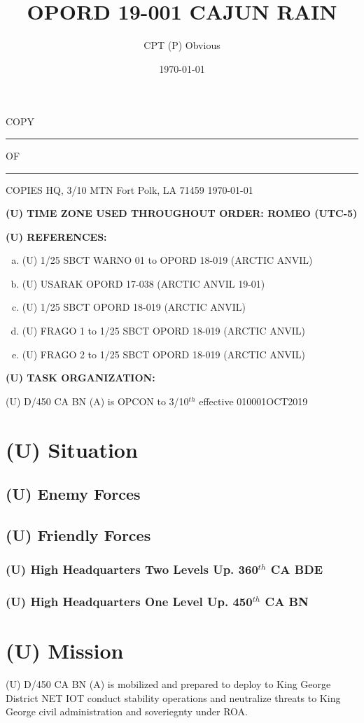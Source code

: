 \documentclass[12pt,letterpaper,notitlepage]{article}
\title{OPORD 19-001 CAJUN RAIN}
\author{CPT (P) Obvious}
\date{\today}
\renewcommand*{\DTMdisplaydate}[4]{%
		\DTMtwodigits{##3} \Milshortmonthname{##2} ##1} %
\newcommand{\Milshortmonthname}[1]{%
	\ifcase#1%
	  \or JAN%
	  \or FEB%
	  \or MAR%
	  \or APR%
	  \or MAY%
	  \or JUN%
	  \or JUL%
	  \or AUG%
	  \or SEP%
	  \or OCT%
	  \or NOV%
	  \or DEC%
	\fi
}
\newcommand{\PM}[1][U]{ {(#1)} }  %
\newcommand{\uptwo}{360$^{th}$ CA BDE}
\newcommand{\upone}{450$^{th}$ CA BN}
\newcommand{\unit}{D/450 CA BN (A)}
\newcommand{\timezone}{ROMEO (UTC-5)}
\begin{document}

\begin{flushright}
COPY \rule{1cm}{0.4pt} OF \rule{1cm}{0.4pt} COPIES \linebreak
HQ, 3/10 MTN \linebreak
Fort Polk, LA 71459 \linebreak
\today
\end{flushright}

\textbf{\PM TIME ZONE USED THROUGHOUT ORDER: \timezone}

\textbf{\PM REFERENCES:}
\begin{enumerate}[(a)]
\item \PM 1/25 SBCT WARNO 01 to OPORD 18-019 (ARCTIC ANVIL)
\item \PM USARAK OPORD 17-038 (ARCTIC ANVIL 19-01)
\item \PM 1/25 SBCT OPORD 18-019 (ARCTIC ANVIL)
\item \PM FRAGO 1 to 1/25 SBCT OPORD 18-019 (ARCTIC ANVIL)
\item \PM FRAGO 2 to 1/25 SBCT OPORD 18-019 (ARCTIC ANVIL)
\end{enumerate}

\textbf{\PM TASK ORGANIZATION:}

\PM \unit{} is OPCON to 3/10$^{th}$ effective 010001OCT2019

\section{\PM Situation}
\subsection{\PM Enemy Forces}
\subsection{\PM Friendly Forces}
\subsubsection{\PM High Headquarters Two Levels Up. \uptwo{}}
\subsubsection{\PM High Headquarters One Level Up. \upone{}}

\section{\PM Mission}
\PM \unit{}
is mobilized and prepared to deploy 
to King George District
NET 
IOT conduct stability operations and neutralize threats to King George civil
	administration and soveriegnty under ROA.
\end{document}
